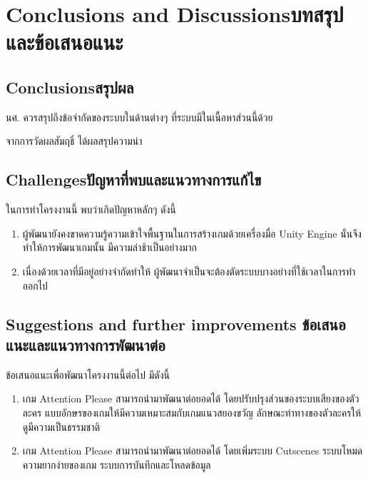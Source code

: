 \chapter{\ifenglish Conclusions and Discussions\else บทสรุปและข้อเสนอแนะ\fi}

\section{\ifenglish Conclusions\else สรุปผล\fi}

นศ. ควรสรุปถึงข้อจำกัดของระบบในด้านต่างๆ ที่ระบบมีในเนื้อหาส่วนนี้ด้วย


จากการวัดผลสัมฤธิ์ ได้ผลสรุปความน่า

\section{\ifenglish Challenges\else ปัญหาที่พบและแนวทางการแก้ไข\fi}

ในการทำโครงงานนี้ พบว่าเกิดปัญหาหลักๆ ดังนี้
\begin{enumerate}
    \item ผู้พัฒนายังคงขาดความรู้ความเข้าใจพื้นฐานในการสร้างเกมด้วยเครื่องมื่อ Unity Engine นั่นจึงทำให้การพัฒนาเกมนั้น มีความล่าช้าเป็นอย่างมาก
    \item เนื่องด้วยเวลาที่มีอยู่อย่างจำกัดทำให้ ผู้พัฒนาจำเป็นจะต้องตัดระบบบางอย่างที่ใช้เวลาในการทำ ออกไป
\end{enumerate}

\section{\ifenglish%
Suggestions and further improvements
\else%
ข้อเสนอแนะและแนวทางการพัฒนาต่อ
\fi
}

ข้อเสนอแนะเพื่อพัฒนาโครงงานนี้ต่อไป มีดังนี้
\begin{enumerate}
    \item เกม Attention Please สามารถนำมาพัฒนาต่อยอดได้ โดยปรับปรุงส่วนของระบบเสียงของตัวละคร แบบอักษรของเกมให้มีความเหมาะสมกับเกมแนวสยองขวัญ ลักษณะท่าทางของตัวละครให้ดูมีความเป็นธรรมชาติ
    \item เกม Attention Please สามารถนำมาพัฒนาต่อยอดได้ โดยเพิ่มระบบ Cutscenes ระบบโหมดความยากง่ายของเกม ระบบการบันทึกและโหลดข้อมูล
\end{enumerate}